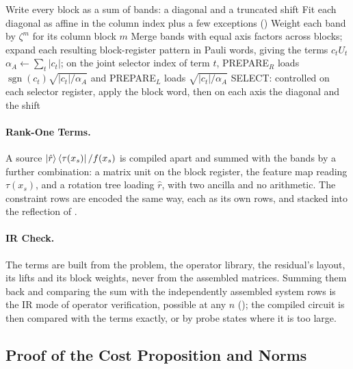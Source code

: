 \begin{algorithm}[htbp]
    \caption{Compiling the rows of $\Adesc$ into two preparations and one SELECT.}
    \label{alg:ir-to-lcu}
    Write every block as a sum of bands: a diagonal and a truncated shift\;
    Fit each diagonal as affine in the column index plus a few exceptions ()\;
    Weight each band by $\zeta^{m}$ for its column block $m$\;
    Merge bands with equal axis factors across blocks; expand each resulting block-register pattern in Pauli words, giving the terms $c_tU_t$\;
    $\alpha_A \leftarrow \sum_{t} |c_t|$; on the joint selector index of term $t$, PREPARE$_R$ loads $\operatorname{sgn}(c_t)\sqrt{|c_t|/\alpha_A}$ and PREPARE$_L$ loads $\sqrt{|c_t|/\alpha_A}$\;
    SELECT: controlled on each selector register, apply the block word, then on each axis the diagonal and the shift\;
    \;
\end{algorithm}

\paragraph{Rank-One Terms.} A source $\ket{\hat r}\bra{\tau(x_s)}/f(x_s)$ is compiled apart and summed with the bands by a further combination: a matrix unit on the block register, the feature map reading $\tau(x_s)$, and a rotation tree loading $\hat r$, with two ancilla and no arithmetic. The constraint rows are encoded the same way, each as its own rows, and stacked into the reflection of .

\paragraph{IR Check.} The terms are built from the problem, the operator library, the residual's layout, its lifts and its block weights, never from the assembled matrices. Summing them back and comparing the sum with the independently assembled system rows is the IR mode of operator verification, possible at any $n$ (); the compiled circuit is then compared with the terms exactly, or by probe states where it is too large.

\subsection{Proof of the Cost Proposition and Norms}
\label{app:proof-descriptor-cost}

